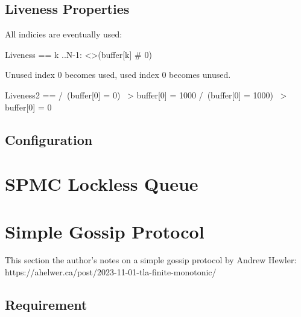 \documentclass{report}
\begin{document}
\section{Liveness Properties}

All indicies are eventually used:

\begin{tla}
    Liveness ==
    \A k ..N-1:
    <>(buffer[k] # 0)
\end{tla}
\begin{tlatex}
%
%
%
\end{tlatex}

Unused index 0 becomes used, used index 0 becomes unused.
\begin{tla}
    Liveness2 ==
    /\ (buffer[0] = 0) ~> buffer[0] = 1000
    /\ (buffer[0] = 1000) ~> buffer[0] = 0
\end{tla}
\begin{tlatex}
%
\end{tlatex}

\section{Configuration}

\chapter{SPMC Lockless Queue}

\chapter{Simple Gossip Protocol}

This section the author's notes on a simple gossip protocol by Andrew Hewler:\newline
https://ahelwer.ca/post/2023-11-01-tla-finite-monotonic/\newline

\section{Requirement}
\end{document}
